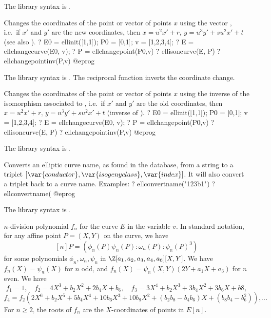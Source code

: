 The library syntax is .

\label{se:ellchangepoint}
Changes the coordinates of the point or
vector of points $x$ using the vector , i.e.~if $x'$ and
$y'$ are the new coordinates, then $x=u^2x'+r$, $y=u^3y'+su^2x'+t$ (see also
).
\bprog
? E0 = ellinit([1,1]); P0 = [0,1]; v = [1,2,3,4];
? E = ellchangecurve(E0, v);
? P = ellchangepoint(P0,v)
? ellisoncurve(E, P)
? ellchangepointinv(P,v)
@eprog

The library syntax is .
The reciprocal function 
inverts the coordinate change.

\label{se:ellchangepointinv}
Changes the coordinates of the point or vector of points $x$ using
the inverse of the isomorphism associated to ,
i.e.~if $x'$ and $y'$ are the old coordinates, then $x=u^2x'+r$,
$y=u^3y'+su^2x'+t$ (inverse of ).
\bprog
? E0 = ellinit([1,1]); P0 = [0,1]; v = [1,2,3,4];
? E = ellchangecurve(E0, v);
? P = ellchangepoint(P0,v)
? ellisoncurve(E, P)
? ellchangepointinv(P,v)
@eprog

The library syntax is .

\label{se:ellconvertname}
Converts an elliptic curve name, as found in the  database,
from a string to a triplet $[\var{conductor}, \var{isogeny class},
\var{index}]$. It will also convert a triplet back to a curve name.
Examples:
\bprog
? ellconvertname("123b1")
? ellconvertname(%
@eprog

The library syntax is .

\label{se:elldivpol}
$n$-division polynomial $f_n$ for the curve $E$ in the
variable $v$. In standard notation, for any affine point $P = (X,Y)$ on the
curve, we have
$$[n]P = (\phi_n(P)\psi_n(P) : \omega_n(P) : \psi_n(P)^3)$$
for some polynomials $\phi_n,\omega_n,\psi_n$ in
$\Z[a_1,a_2,a_3,a_4,a_6][X,Y]$. We have $f_n(X) = \psi_n(X)$ for $n$ odd, and
$f_n(X) = \psi_n(X,Y) (2Y + a_1X+a_3)$ for $n$ even. We have
$$ f_1  = 1,\quad f_2 = 4X^3 + b_2X^2 + 2b_4 X + b_6, \quad f_3 = 3 X^4 + b_2 X^3 + 3b_4 X^2 + 3 b_6 X + b8, $$
$$ f_4 = f_2(2X^6 + b_2 X^5 + 5b_4 X^4 + 10 b_6 X^3 + 10 b_8 X^2 +
(b_2b_8-b_4b_6)X + (b_8b_4 - b_6^2)), \dots $$
For $n \geq 2$, the roots of $f_n$ are the $X$-coordinates of points in $E[n]$.

